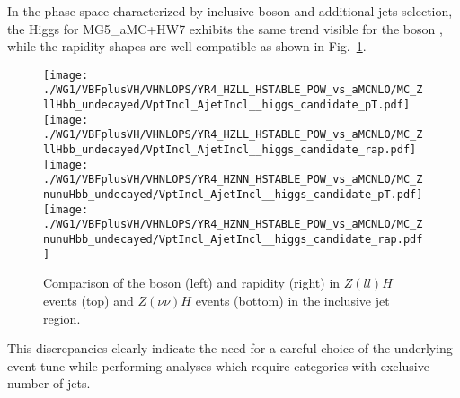 In the phase space characterized by inclusive boson \pt and additional jets selection, the Higgs \pt for {\sc MG5\_aMC}+HW7 exhibits 
the same trend visible for the boson \pt, while the rapidity shapes are well compatible
as shown in Fig.~\ref{fig:stable__incl_hig}.
\begin{figure}
\centering
\texttt{[image: ./WG1/VBFplusVH/VHNLOPS/YR4\_HZLL\_HSTABLE\_POW\_vs\_aMCNLO/MC\_ZllHbb\_undecayed/VptIncl\_AjetIncl\_\_higgs\_candidate\_pT.pdf]}
\texttt{[image: ./WG1/VBFplusVH/VHNLOPS/YR4\_HZLL\_HSTABLE\_POW\_vs\_aMCNLO/MC\_ZllHbb\_undecayed/VptIncl\_AjetIncl\_\_higgs\_candidate\_rap.pdf]}
\texttt{[image: ./WG1/VBFplusVH/VHNLOPS/YR4\_HZNN\_HSTABLE\_POW\_vs\_aMCNLO/MC\_ZnunuHbb\_undecayed/VptIncl\_AjetIncl\_\_higgs\_candidate\_pT.pdf]}
\texttt{[image: ./WG1/VBFplusVH/VHNLOPS/YR4\_HZNN\_HSTABLE\_POW\_vs\_aMCNLO/MC\_ZnunuHbb\_undecayed/VptIncl\_AjetIncl\_\_higgs\_candidate\_rap.pdf]}
\caption{Comparison of the boson \pt (left) and rapidity (right) in $Z(ll)H$ events (top) and $Z(\nu\nu)H$ events (bottom) in the inclusive jet region.}
\label{fig:stable__incl_hig}
\end{figure}

This discrepancies clearly indicate the need for a careful choice of the underlying event tune
while performing analyses which require categories with exclusive number of jets.


